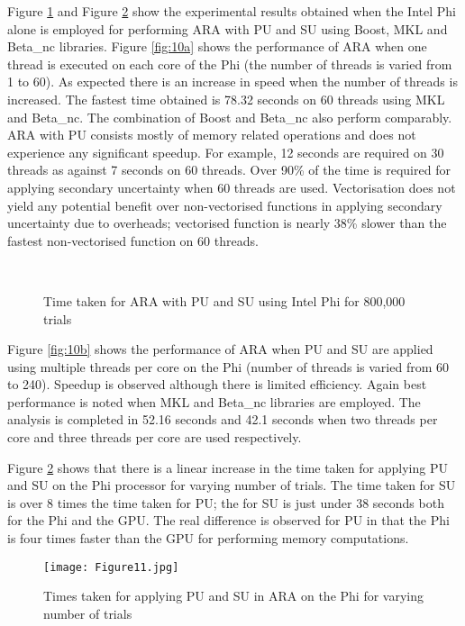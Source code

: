 Figure \ref{figure10} and Figure \ref{figure11} show the experimental results obtained when the Intel Phi alone is employed for performing ARA with PU and SU using Boost, MKL and Beta\_nc libraries. 
Figure \ref{fig:10a} shows the performance of ARA when one thread is executed on each core of the Phi (the number of threads is varied from 1 to 60). 
As expected there is an increase in speed when the number of threads is increased. 
The fastest time obtained is 78.32 seconds on 60 threads using MKL and Beta\_nc. 
The combination of Boost and Beta\_nc also perform comparably. 
ARA with PU consists mostly of memory related operations and does not experience any significant speedup. 
For example, 12 seconds are required on 30 threads as against 7 seconds on 60 threads. 
Over 90\% of the time is required for applying secondary uncertainty when 60 threads are used. 
Vectorisation does not yield any potential benefit over non-vectorised functions in applying secondary uncertainty due to overheads; vectorised function is nearly 38\% slower than the fastest non-vectorised function on 60 threads.  

\begin{figure} \centering
	 \\
\caption{Time taken for ARA with PU and SU using Intel Phi for 800,000 trials}
\label{figure10}
\end{figure}

Figure \ref{fig:10b} shows the performance of ARA when PU and SU are applied using multiple threads per core on the Phi (number of threads is varied from 60 to 240). 
Speedup is observed although there is limited efficiency. 
Again best performance is noted when MKL and Beta\_nc libraries are employed. 
The analysis is completed in 52.16 seconds and 42.1 seconds when two threads per core and three threads per core are used respectively.

Figure \ref{figure11} shows that there is a linear increase in the time taken for applying PU and SU on the Phi processor for varying number of trials. The time taken for SU is over 8 times the time taken for PU; the for SU is just under 38 seconds both for the Phi and the GPU. The real difference is observed for PU in that the Phi is four times faster than the GPU for performing memory computations. 

\begin{figure}
	\centering
	\texttt{[image: Figure11.jpg]}
	\caption{Times taken for applying PU and SU in ARA on the Phi for varying number of trials}
	\label{figure11}
\end{figure}



